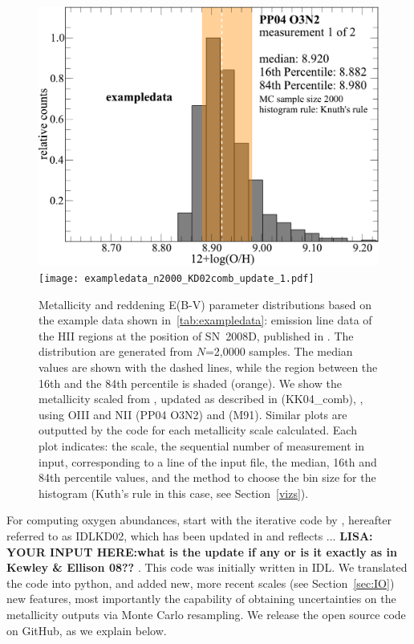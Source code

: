 \documentclass{emulateapj}
\begin{document}
\begin{figure}[!ht]
{\includegraphics[width=0.98\columnwidth]{exampledata_n2000_PP04_O3N2_1.pdf}
\texttt{[image: exampledata\_n2000\_KD02comb\_update\_1.pdf]}}
\caption{Metallicity and reddening E(B-V) parameter distributions based on the example data shown in~\ref{tab:exampledata}: emission line data of the HII regions at the position of SN~2008D, published in \citet{modjaz11}. The distribution are generated from $N$=2,0000 samples. The median values are shown with the dashed lines, while the region between the 16th and the 84th percentile is shaded (orange). We show the metallicity scaled from \citet{kobulnicky04}, updated as described in  \citet{kewley08} (KK04\_comb), \citet{pettini04}, using OIII and NII  (PP04 O3N2) and \citet{mcgaugh91} (M91). Similar plots are outputted by the code for each metallicity scale calculated. Each plot indicates: the scale, the sequential number of measurement in input, corresponding to a line of the input file, the median, 16th and 84th percentile values, and the method to choose the bin size for the histogram (Kuth's rule in this case, see Section~\ref{vizs}).}
 \label{metallicity_distribution}
\end{figure}


For computing oxygen abundances, start with the iterative code by \citet{kewley02}, hereafter referred to as IDLKD02, which has been updated in \citet{kewley08} and reflects ... \textbf{LISA: YOUR INPUT HERE:what is the update if any or is it exactly as in Kewley \& Ellison 08?? }. This code was initially written in IDL.  We translated the code into python, and added new, more recent scales (see Section~\ref{sec:IO}) new features, most importantly the capability of obtaining uncertainties on the metallicity outputs via Monte Carlo resampling. We release the open source code on GitHub, as we explain below.
\end{document}
